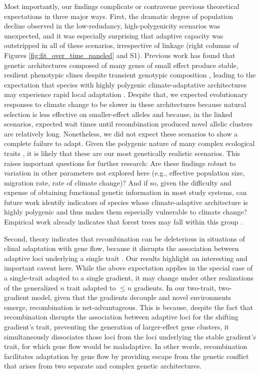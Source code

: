 \documentclass[9pt,twocolumn,twoside,lineno]{pnas-new}
\begin{document}
Most importantly, our findings complicate or contravene previous theoretical expectations in
three major ways.
First, the dramatic degree of population decline observed in the low-redudancy, high-polygenicity
scenarios was unexpected,
and it was especially surprising that adaptive capacity was outstripped in all of these scenarios, irrespective of 
linkage (right columns of Figures \ref{fig:fit_over_time_paneled} and S1).
Previous work has found that genetic architectures composed
of many genes of small effect produce stable, resilient phenotypic clines despite transient genotypic composition \cite{yeaman_amnat,yeaman_review},
leading to the expectation that species with highly polygenic climate-adaptative architectures 
may experience rapid local adaptation \cite{aitken_yeaman}. 
Despite that, we expected evolutionary responses to climate change
to be slower in these architectures
because natural selection is less effective on smaller-effect alleles
and because, in the linked scenarios,
expected wait times until recombination produced novel allelic clusters are relatively long.
Nonetheless, we did not expect these scenarios to show a complete failure to adapt.
Given the polygenic nature of many complex ecological traits \cite{barghi_polygenic,boyle,rockman,savolainen,sella},
it is likely that these are our most genetically realistic scenarios.
This raises important questions for further research:
Are these findings robust to variation in other parameters
not explored here (e.g., effective population size, migration rate, rate of climate change)? 
And if so,
given the difficulty and expense of obtaining functional genetic
information in most study systems,
can future work identify indicators of species whose
climate-adaptive architecture is highly polygenic
and thus makes them especially vulnerable to climate change?
Empirical work already indicates
that forest trees may fall within this group
\cite{lind,aitken_yeaman}.


Second, theory indicates that recombination can be deleterious
in situations of clinal adaptation
with gene flow, because it disrupts the association between adaptive loci 
underlying a single trait \cite{tigano}.
Our results highlight an interesting and important caveat here.
While the above expectation applies in the special case of a single-trait 
adapted to a single gradient,
it may change under other realizations of the 
generalized $n$ trait adapted to $\leq n$ gradients.
In our two-trait, two-gradient model, given that the gradients decouple
and novel environments emerge,
recombination is net-advantageous.
This is because, despite the fact that recombination disrupts the association between
adaptive loci for the shifting gradient's trait, preventing the
generation of larger-effect gene clusters,
it simultaneously dissociates those loci from the loci underlying
the stable gradient's trait, for which gene flow would be maladaptive.
In other words, recombination facilitates adaptation by gene flow
by providing escape from the genetic conflict that arises
from two separate and complex genetic architectures.
  
\end{document}
